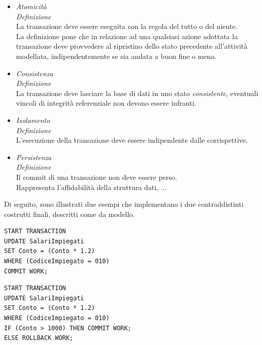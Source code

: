 \documentclass{article}
\begin{document}
\begin{itemize}[label={-}]
    \itemsep0em
    \item \textit{Atomicità}\vspace*{7pt}\\ \textit{Definizione}\\La transazione deve essere eseguita con la regola del tutto o del niente.\vspace*{7pt}\\ La definizione pone che in relazione ad una qualsiasi azione adottata la transazione deve provvedere al ripristino dello stato precedente all'attività modellata, indipendentemente se sia andata a buon fine o meno.
    \item \textit{Consistenza}\vspace*{7pt}\\ \textit{Definizione}\\La transazione deve lasciare la base di dati in uno stato \textit{consistente}, eventuali vincoli di integrità referenziale non devono essere infranti.
    \item \textit{Isolamento}\vspace*{7pt}\\ \textit{Definizione}\\L'esecuzione della transazione deve essere indipendente dalle corrispettive.
    \item \textit{Persistenza}\vspace*{7pt}\\ \textit{Definizione}\\Il commit di una transazione non deve essere perso.\vspace*{14pt}\\Rappresenta l'affidabilità della struttura dati, ... 
\end{itemize}
Di seguito, sono illustrati due esempi che implementano i due contraddistinti costrutti finali, descritti come da modello.\vspace*{14pt}\\
\begin{minipage}{\textwidth}
    \begin{lstlisting}
START TRANSACTION
UPDATE SalariImpiegati
SET Conto = (Conto * 1.2)
WHERE (CodiceImpiegato = 010)
COMMIT WORK;
    \end{lstlisting}
\end{minipage}\vspace*{14pt}
\begin{minipage}{\textwidth}
    \begin{lstlisting}
START TRANSACTION
UPDATE SalariImpiegati
SET Conto = (Conto * 1.2)
WHERE (CodiceImpiegato = 010)
IF (Conto > 1000) THEN COMMIT WORK;
ELSE ROLLBACK WORK;
    \end{lstlisting}
\end{minipage}\vspace*{14pt}
\end{document}
